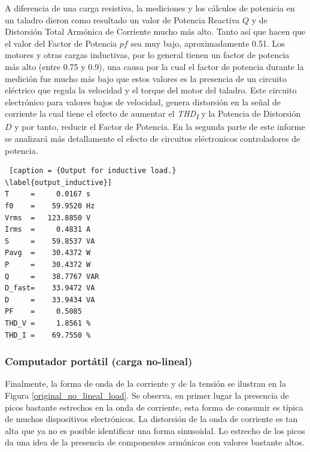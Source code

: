 \documentclass[journal]{IEEEtran}
\begin{document}
A diferencia de una carga resistiva, la mediciones y 
los cálculos de potenicia en un taladro dieron como 
resultado un valor de  
Potencia Reactiva $Q$ y de Distorsión Total Armónica 
de Corriente mucho más alto. Tanto así que hacen 
que el valor del Factor de Potencia $pf$ sea muy bajo, 
aproximadamente 0.51. Los motores y otras cargas 
inductivas, por lo general tienen un factor de potencia 
más alto (entre 0.75 y 0.9), una causa por la cual el 
factor de potencia durante la medición fue mucho más 
bajo que estos valores es la presencia de un circuito 
eléctrico que regula la velocidad y el torque del 
motor del taladro. Este circuito electrónico para 
valores bajos de velocidad, genera distorsión en la 
señal de corriente la cual tiene el efecto de  
aumentar el \textit{THD\textsubscript{I}} y la Potencia 
de Distorsión $D$ y por tanto, reducir el Factor de 
Potencia. En la segunda parte de este informe se analizará
más detallamente el efecto de circuitos eléctronicos 
controladores de potencia. \\

\begin{lstlisting} [caption = {Output for inductive load.}
\label{output_inductive}]
T     =     0.0167 s 
f0    =    59.9520 Hz 
Vrms  =   123.8850 V
Irms  =     0.4831 A
S     =    59.8537 VA
Pavg  =    30.4372 W 
P     =    30.4372 W 
Q     =    38.7767 VAR 
D_fast=    33.9472 VA 
D     =    33.9434 VA 
PF    =     0.5085 
THD_V =     1.8561 %
THD_I =    69.7550 %
\end{lstlisting}

\subsubsection{Computador portátil (carga no-lineal)} 
Finalmente,  la forma de onda de la corriente y de la 
tensión se ilustran en la Figura 
\ref{original_no_lineal_load}. Se observa, en primer lugar
la presencia de picos bastante estrechos en la onda  
de corriente, esta forma de consumir 
es típica de muchos dispositivos electrónicos. 
La distorsión de la onda de corriente es tan alta que ya 
no es posible identificar una forma sinusoidal. 
Lo estrecho de los picos da una idea de la presencia de 
componentes armónicas con valores bastante altos. 

\end{document}
